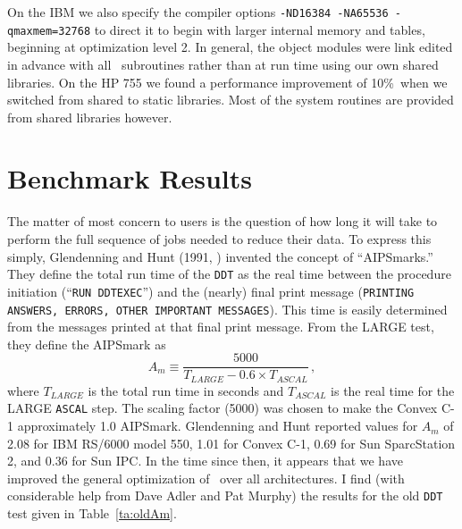 On the IBM we also specify the compiler options {\tt -ND16384 -NA65536
-qmaxmem=32768} to direct it to begin with larger internal memory and
tables, beginning at optimization level 2.  In general, the object
modules were link edited in advance with all \AIPS\ subroutines rather
than at run time using our own shared libraries.  On the HP 755 we
found a performance improvement of 10\%\ when we switched from shared
to static libraries.  Most of the system routines are provided from
shared libraries however.

\clearpage

\section{Benchmark Results}

The matter of most concern to users is the question of how long it
will take to perform the full sequence of jobs needed to reduce their
data.  To express this simply, Glendenning and Hunt (1991,
\cite{kn:AM75}) invented the concept of ``AIPSmarks.''  They define
the total run time of the {\tt DDT} as the real time between the
procedure initiation (``{\tt RUN DDTEXEC}'') and the (nearly) final
print message ({\tt PRINTING ANSWERS, ERRORS, OTHER IMPORTANT
MESSAGES}).  This time is easily determined from the messages printed
at that final print message.  From the LARGE test, they define the
AIPSmark as
$$
        A_m \equiv \frac{5000}{T_{LARGE} - 0.6 \times T_{ASCAL}} \, ,
$$
where $T_{LARGE}$ is the total run time in seconds and $T_{ASCAL}$ is
the real time for the LARGE {\tt ASCAL} step.  The scaling factor
(5000) was chosen to make the Convex C-1 approximately 1.0 AIPSmark.
Glendenning and Hunt reported values for $A_m$ of 2.08 for IBM RS/6000
model 550, 1.01 for Convex C-1, 0.69 for Sun SparcStation 2, and 0.36
for Sun IPC.  In the time since then, it appears that we have improved
the general optimization of \AIPS\ over all architectures.  I find
(with considerable help from Dave Adler and Pat Murphy) the results
for the old {\tt DDT} test given in Table~\ref{ta:oldAm}.
